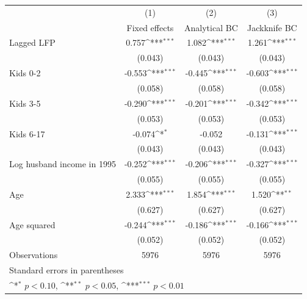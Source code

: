 {
\def\sym#1{\ifmmode^{#1}\else\(^{#1}\)\fi}
\begin{tabular}{l*{3}{c}}
\hline\hline
                &\multicolumn{1}{c}{(1)}&\multicolumn{1}{c}{(2)}&\multicolumn{1}{c}{(3)}\\
                &\multicolumn{1}{c}{Fixed effects}&\multicolumn{1}{c}{Analytical BC}&\multicolumn{1}{c}{Jackknife BC}\\
\hline
Lagged LFP      &    0.757\sym{***}&    1.082\sym{***}&    1.261\sym{***}\\
                &  (0.043)         &  (0.043)         &  (0.043)         \\
[1em]
Kids 0-2        &   -0.553\sym{***}&   -0.445\sym{***}&   -0.603\sym{***}\\
                &  (0.058)         &  (0.058)         &  (0.058)         \\
[1em]
Kids 3-5        &   -0.290\sym{***}&   -0.201\sym{***}&   -0.342\sym{***}\\
                &  (0.053)         &  (0.053)         &  (0.053)         \\
[1em]
Kids 6-17       &   -0.074\sym{*}  &   -0.052         &   -0.131\sym{***}\\
                &  (0.043)         &  (0.043)         &  (0.043)         \\
[1em]
Log husband income in 1995 &   -0.252\sym{***}&   -0.206\sym{***}&   -0.327\sym{***}\\
                &  (0.055)         &  (0.055)         &  (0.055)         \\
[1em]
Age             &    2.333\sym{***}&    1.854\sym{***}&    1.520\sym{**} \\
                &  (0.627)         &  (0.627)         &  (0.627)         \\
[1em]
Age squared     &   -0.244\sym{***}&   -0.186\sym{***}&   -0.166\sym{***}\\
                &  (0.052)         &  (0.052)         &  (0.052)         \\
\hline
Observations    &     5976         &     5976         &     5976         \\
\hline\hline
\multicolumn{4}{l}{\footnotesize Standard errors in parentheses}\\
\multicolumn{4}{l}{\footnotesize \sym{*} \(p<0.10\), \sym{**} \(p<0.05\), \sym{***} \(p<0.01\)}\\
\end{tabular}
}
